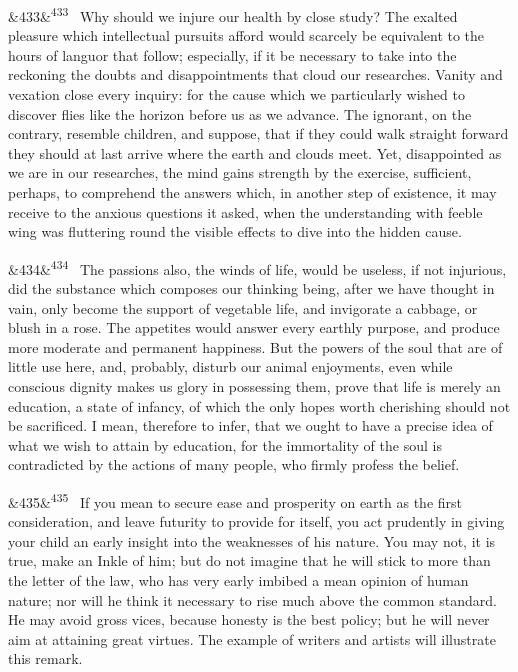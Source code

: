 \documentclass[12pt]{article}
\newcommand{\para}[1][]{\par\noindent\ifx&#1&\else\textsuperscript{\footnotesize #1}~\fi}
\begin{document}
\para[433] Why should we injure our health by close study? The exalted pleasure which intellectual pursuits afford would scarcely be equivalent to the hours of languor that follow; especially, if it be necessary to take into the reckoning the doubts and disappointments that cloud our researches. Vanity and vexation close every inquiry: for the cause which we particularly wished to discover flies like the horizon before us as we advance. The ignorant, on the contrary, resemble children, and suppose, that if they could walk straight forward they should at last arrive where the earth and clouds meet. Yet, disappointed as we are in our researches, the mind gains strength by the exercise, sufficient, perhaps, to comprehend the answers which, in another step of existence, it may receive to the anxious questions it asked, when the understanding with feeble wing was fluttering round the visible effects to dive into the hidden cause.

\para[434] The passions also, the winds of life, would be useless, if not injurious, did the substance which composes our thinking being, after we have thought in vain, only become the support of vegetable life, and invigorate a cabbage, or blush in a rose. The appetites would answer every earthly purpose, and produce more moderate and permanent happiness. But the powers of the soul that are of little use here, and, probably, disturb our animal enjoyments, even while conscious dignity makes us glory in possessing them, prove that life is merely an education, a state of infancy, of which the only hopes worth cherishing should not be sacrificed. I mean, therefore to infer, that we ought to have a precise idea of what we wish to attain by education, for the immortality of the soul is contradicted by the actions of many people, who firmly profess the belief.

\para[435] If you mean to secure ease and prosperity on earth as the first consideration, and leave futurity to provide for itself, you act prudently in giving your child an early insight into the weaknesses of his nature. You may not, it is true, make an Inkle of him; but do not imagine that he will stick to more than the letter of the law, who has very early imbibed a mean opinion of human nature; nor will he think it necessary to rise much above the common standard. He may avoid gross vices, because honesty is the best policy; but he will never aim at attaining great virtues. The example of writers and artists will illustrate this remark.
\end{document}
